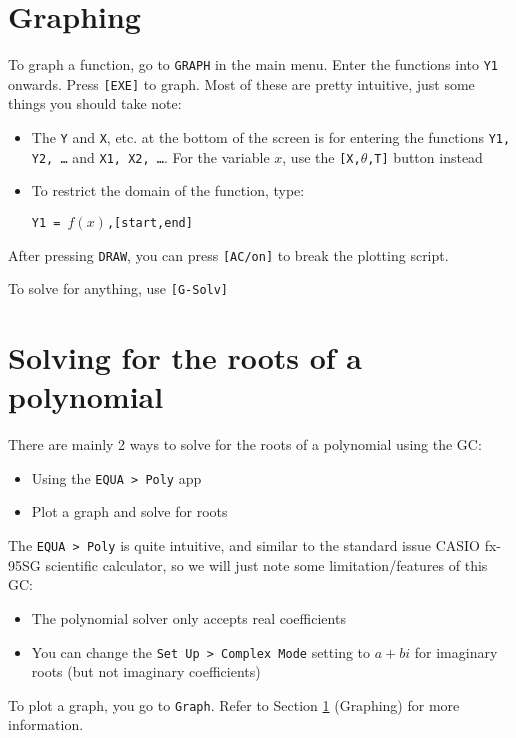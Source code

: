 \documentclass[a5paper]{memoir}
\def\code#1{\texttt{#1}}
\begin{document}
\section{Graphing} \label{graphing}
To graph a function, go to \code{GRAPH} in the main menu. Enter the functions into \code{Y1} onwards. Press \code{[EXE]} to graph. Most of these are pretty intuitive, just some things you should take note:
\begin{itemize}
	\item The \code{Y} and \code{X}, etc. at the bottom of the screen is for entering the functions \code{Y1, Y2, \dots} and \code{X1, X2, \dots}. For the variable $x$, use the \code{[X,$\theta$,T]} button instead
	\item To restrict the domain of the function, type:
	\begin{center}
		\code{Y1 = $f(x)$,[start,end]}
	\end{center}
\end{itemize}

After pressing \code{DRAW}, you can press \code{[AC/on]} to break the plotting script.

To solve for anything, use \code{[G-Solv]}


\section{Solving for the roots of a polynomial}
There are mainly 2 ways to solve for the roots of a polynomial using the GC:
\begin{itemize}
	\item Using the \code{EQUA > Poly} app
	\item Plot a graph and solve for roots
\end{itemize}

The \code{EQUA > Poly} is quite intuitive, and similar to the standard issue CASIO fx-95SG scientific calculator, so we will just note some limitation/features of this GC:
\begin{itemize}
	\item The polynomial solver only accepts real coefficients
	\item You can change the \code{Set Up > Complex Mode} setting to \code{$a+bi$} for imaginary roots (but not imaginary coefficients)
\end{itemize}

To plot a graph, you go to \code{Graph}. Refer to Section \ref{graphing} (Graphing) for more information.
\end{document}

